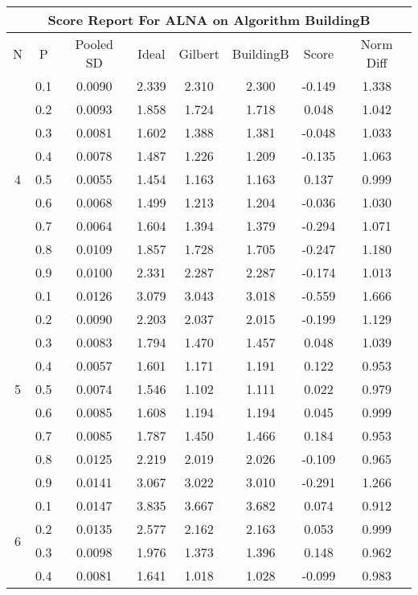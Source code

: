 \documentclass[11pt,a4paper]{report}
\begin{document}
\begin{longtable}{ | c | c || c | c | c | c | c | c | }
\hline
\multicolumn{8}{|c|}{ Score Report For ALNA on Algorithm BuildingB} \\
\hline
N & P & Pooled SD &  Ideal &  Gilbert & BuildingB  & Score & Norm Diff \\
 \hline
 \hline
 \endhead
\multirow{9}{*}{4} & 0.1 & 0.0090 & 2.339 & 2.310 & 2.300 & -0.149 & 1.338 \\
 & 0.2 & 0.0093 & 1.858 & 1.724 & 1.718 & 0.048 & 1.042 \\
 & 0.3 & 0.0081 & 1.602 & 1.388 & 1.381 & -0.048 & 1.033 \\
 & 0.4 & 0.0078 & 1.487 & 1.226 & 1.209 & -0.135 & 1.063 \\
 & 0.5 & 0.0055 & 1.454 & 1.163 & 1.163 & 0.137 & 0.999 \\
 & 0.6 & 0.0068 & 1.499 & 1.213 & 1.204 & -0.036 & 1.030 \\
 & 0.7 & 0.0064 & 1.604 & 1.394 & 1.379 & -0.294 & 1.071 \\
 & 0.8 & 0.0109 & 1.857 & 1.728 & 1.705 & -0.247 & 1.180 \\
 & 0.9 & 0.0100 & 2.331 & 2.287 & 2.287 & -0.174 & 1.013 \\
 \hline
\multirow{9}{*}{5} & 0.1 & 0.0126 & 3.079 & 3.043 & 3.018 & -0.559 & 1.666 \\
 & 0.2 & 0.0090 & 2.203 & 2.037 & 2.015 & -0.199 & 1.129 \\
 & 0.3 & 0.0083 & 1.794 & 1.470 & 1.457 & 0.048 & 1.039 \\
 & 0.4 & 0.0057 & 1.601 & 1.171 & 1.191 & 0.122 & 0.953 \\
 & 0.5 & 0.0074 & 1.546 & 1.102 & 1.111 & 0.022 & 0.979 \\
 & 0.6 & 0.0085 & 1.608 & 1.194 & 1.194 & 0.045 & 0.999 \\
 & 0.7 & 0.0085 & 1.787 & 1.450 & 1.466 & 0.184 & 0.953 \\
 & 0.8 & 0.0125 & 2.219 & 2.019 & 2.026 & -0.109 & 0.965 \\
 & 0.9 & 0.0141 & 3.067 & 3.022 & 3.010 & -0.291 & 1.266 \\
 \hline
\multirow{9}{*}{6} & 0.1 & 0.0147 & 3.835 & 3.667 & 3.682 & 0.074 & 0.912 \\
 & 0.2 & 0.0135 & 2.577 & 2.162 & 2.163 & 0.053 & 0.999 \\
 & 0.3 & 0.0098 & 1.976 & 1.373 & 1.396 & 0.148 & 0.962 \\
 & 0.4 & 0.0081 & 1.641 & 1.018 & 1.028 & -0.099 & 0.983 \\

\end{longtable}
\end{document}
